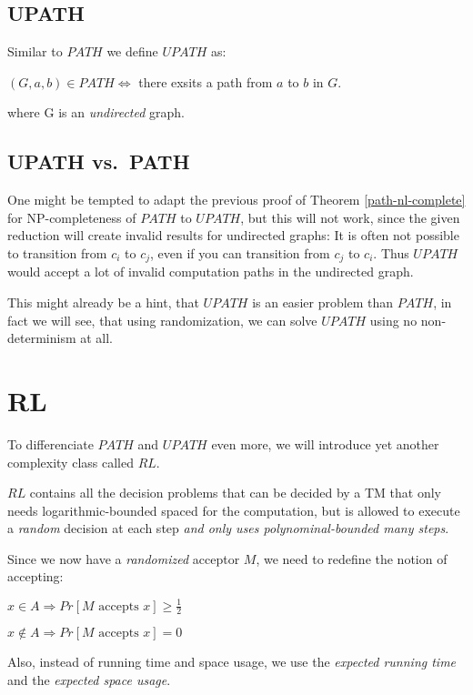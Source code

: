 \section{UPATH}\label{upath}

Similar to $PATH$ we define $UPATH$ as:

$(G, a, b) \in PATH \Leftrightarrow $ there exsits a path from $a$ to
$b$ in $G$.

where G is an \emph{undirected} graph.

\section{UPATH vs.~PATH}\label{upath-vs.path}

One might be tempted to adapt the previous proof of Theorem
\ref{path-nl-complete} for NP-completeness of $PATH$ to $UPATH$, but
this will not work, since the given reduction will create invalid
results for undirected graphs: It is often not possible to transition
from $c_i$ to $c_j$, even if you can transition from $c_j$ to $c_i$.
Thus $UPATH$ would accept a lot of invalid computation paths in the
undirected graph.

This might already be a hint, that $UPATH$ is an easier problem than
$PATH$, in fact we will see, that using randomization, we can solve
$UPATH$ using no non-determinism at all.

\chapter{RL}\label{rl}

To differenciate $PATH$ and $UPATH$ even more, we will introduce yet
another complexity class called $RL$.

$RL$ contains all the decision problems that can be decided by a TM that
only needs logarithmic-bounded spaced for the computation, but is
allowed to execute a \emph{random} decision at each step \emph{and only
uses polynominal-bounded many steps}.

Since we now have a \emph{randomized} acceptor $M$, we need to redefine
the notion of accepting:

$x \in A \Rightarrow Pr[M \text{ accepts } x] \geq \frac{1}{2}$

$x \not \in A \Rightarrow Pr[M \text{ accepts } x] = 0$

Also, instead of running time and space usage, we use the \emph{expected
running time} and the \emph{expected space usage}.

